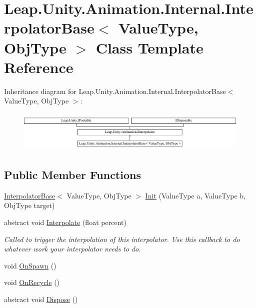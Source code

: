 \hypertarget{class_leap_1_1_unity_1_1_animation_1_1_internal_1_1_interpolator_base}{}\section{Leap.\+Unity.\+Animation.\+Internal.\+Interpolator\+Base$<$ Value\+Type, Obj\+Type $>$ Class Template Reference}
\label{class_leap_1_1_unity_1_1_animation_1_1_internal_1_1_interpolator_base}
Inheritance diagram for Leap.\+Unity.\+Animation.\+Internal.\+Interpolator\+Base$<$ Value\+Type, Obj\+Type $>$\+:\begin{figure}[H]
\begin{center}
\leavevmode
\includegraphics[height=1.985816cm]{class_leap_1_1_unity_1_1_animation_1_1_internal_1_1_interpolator_base}
\end{center}
\end{figure}
\subsection*{Public Member Functions}
\begin{DoxyCompactItemize}
\item 
\mbox{\hyperlink{class_leap_1_1_unity_1_1_animation_1_1_internal_1_1_interpolator_base}{Interpolator\+Base}}$<$ Value\+Type, Obj\+Type $>$ \mbox{\hyperlink{class_leap_1_1_unity_1_1_animation_1_1_internal_1_1_interpolator_base_ab994d7f2cd32f028b40c68426cdc5e5e}{Init}} (Value\+Type a, Value\+Type b, Obj\+Type target)
\item 
abstract void \mbox{\hyperlink{class_leap_1_1_unity_1_1_animation_1_1_internal_1_1_interpolator_base_acd571d432a4896887739026e3f9fd936}{Interpolate}} (float percent)
\begin{DoxyCompactList}\small\item\em Called to trigger the interpolation of this interpolator. Use this callback to do whatever work your interpolator needs to do. \end{DoxyCompactList}\item 
void \mbox{\hyperlink{class_leap_1_1_unity_1_1_animation_1_1_internal_1_1_interpolator_base_a41d605569ecfa9f2e9e708e452746b83}{On\+Spawn}} ()
\item 
void \mbox{\hyperlink{class_leap_1_1_unity_1_1_animation_1_1_internal_1_1_interpolator_base_a2721fd11c2638b2f02792c3a73816346}{On\+Recycle}} ()
\item 
abstract void \mbox{\hyperlink{class_leap_1_1_unity_1_1_animation_1_1_internal_1_1_interpolator_base_a8949a18bfa04b24b04e6c24980f48e55}{Dispose}} ()
\end{DoxyCompactItemize}
